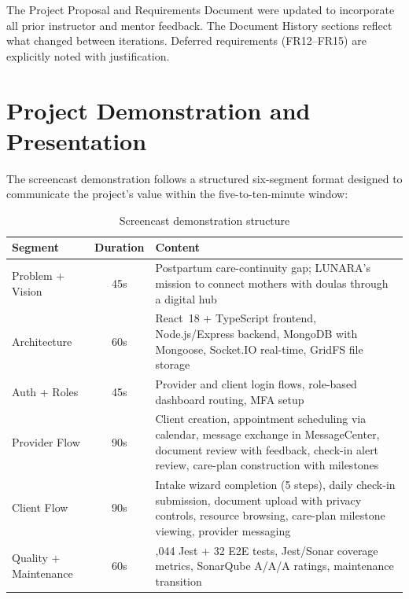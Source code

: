 \documentclass[12pt,letterpaper]{article}
\begin{document}
{\begin{longtable}{|>{\raggedright\arraybackslash}p{3.5cm}|>{\raggedright\arraybackslash}p{4.8cm}|>{\raggedright\arraybackslash}p{4.7cm}|}
\end{longtable}
}

The Project Proposal and Requirements Document were updated to incorporate all prior instructor and mentor feedback. The Document History sections reflect what changed between iterations. Deferred requirements (FR12--FR15) are explicitly noted with justification.

\newpage

\section{Project Demonstration and Presentation}

The screencast demonstration follows a structured six-segment format designed to communicate the project's value within the five-to-ten-minute window:

\begin{table}[H]
\centering
\small
\begin{tabularx}{\textwidth}{|>{\raggedright\arraybackslash}p{2.8cm}|c|>{\raggedright\arraybackslash}X|}
\hline
\rowcolor{TableHeader}\textcolor{TableHeaderText}{\textbf{Segment}} & \textcolor{TableHeaderText}{\textbf{Duration}} & \textcolor{TableHeaderText}{\textbf{Content}} \\
\hline
Problem + Vision & 45s & Postpartum care-continuity gap; LUNARA's mission to connect mothers with doulas through a digital hub \\
\hline
\rowcolor{TableRowAlt}
Architecture & 60s & React~18 + TypeScript frontend, Node.js/Express backend, MongoDB with Mongoose, Socket.IO real-time, GridFS file storage \\
\hline
Auth + Roles & 45s & Provider and client login flows, role-based dashboard routing, MFA setup \\
\hline
\rowcolor{TableRowAlt}
Provider Flow & 90s & Client creation, appointment scheduling via calendar, message exchange in MessageCenter, document review with feedback, check-in alert review, care-plan construction with milestones \\
\hline
Client Flow & 90s & Intake wizard completion (5 steps), daily check-in submission, document upload with privacy controls, resource browsing, care-plan milestone viewing, provider messaging \\
\hline
\rowcolor{TableRowAlt}
Quality + Maintenance & 60s & 1,044 Jest + 32 E2E tests, Jest/Sonar coverage metrics, SonarQube A/A/A ratings, maintenance transition \\
\hline
\end{tabularx}
\caption{Screencast demonstration structure}
\end{table}
\end{document}
